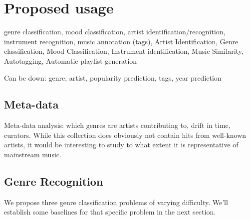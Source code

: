 \documentclass{article}
\begin{document}
\section{Proposed usage} %



genre classification, mood classification, artist identification/recognition, instrument recognition, music annotation (tags),
Artist Identification, Genre classification, Mood Classification, Instrument identification, Music Similarity, Autotagging, Automatic playlist generation

Can be down: genre, artist, popularity prediction, tags, year prediction




\subsection{Meta-data}

Meta-data analysis: which genres are artists contributing to, drift in time, curators.
While this collection does obviously not contain hits from well-known artists, it would be interesting to study to what extent it is representative of mainstream music.

\subsection{Genre Recognition}

We propose three genre classification problems of varying difficulty. We'll establish some baselines for that specific problem in the next section.
\end{document}
